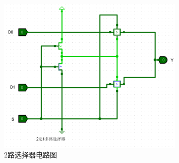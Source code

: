\documentclass{article}
\begin{document}
    \begin{figure}[H]
    \centering
    \includegraphics[width=0.8\textwidth]{4.4.2.png}
    \caption{2路选择器电路图}
    \end{figure}
\end{document}
